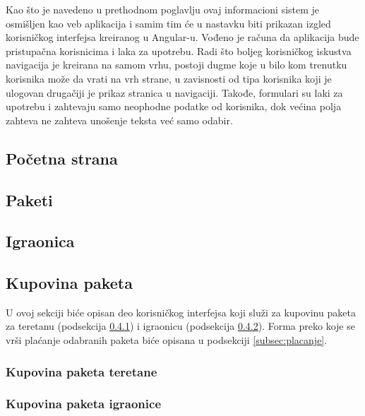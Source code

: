 \documentclass[../main.tex]{subfiles}
\begin{document}
Kao što je navedeno u prethodnom poglavlju ovaj informacioni sistem je osmišljen kao veb aplikacija i samim tim će u nastavku biti prikazan izgled korisničkog interfejsa kreiranog u Angular-u.
Vođeno je računa da aplikacija bude pristupačna korisnicima i laka za upotrebu. Radi što boljeg korisničkog iskustva navigacija je kreirana na samom vrhu, postoji dugme koje u bilo kom trenutku korisnika može da vrati na vrh strane, u zavisnosti od tipa korisnika koji je ulogovan drugačiji je prikaz stranica u navigaciji. Takođe, formulari su laki za upotrebu i zahtevaju samo neophodne podatke od korisnika, dok većina polja zahteva ne zahteva unošenje teksta već samo odabir.


\subsection{Početna strana}



\subsection{Paketi}



\subsection{Igraonica}



\subsection{Kupovina paketa}
U ovoj sekciji biće opisan deo korisničkog interfejsa koji služi za kupovinu paketa za teretanu (podsekcija \ref{subsec:kp_teretane}) i igraonicu (podsekcija \ref{subsec:kp_igraonice}). Forma preko koje se vrši plaćanje odabranih paketa biće opisana u podsekciji \ref{subsec:placanje}.

\subsubsection{Kupovina paketa teretane}
\label{subsec:kp_teretane}


\subsubsection{Kupovina paketa igraonice}
\label{subsec:kp_igraonice}

\end{document}
